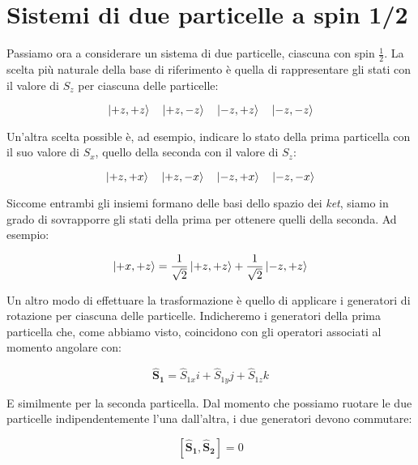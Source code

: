\section{Sistemi di due particelle a spin 1/2}

	Passiamo ora a considerare un sistema di due particelle, ciascuna con spin $\tfrac{1}{2}$. La scelta pi\`u naturale della base di riferimento \`e quella di rappresentare gli stati con il valore di $S_z$ per ciascuna delle particelle:

	\begin{equation} \label{eq:twoPartState}
		\ket{+z, +z} \quad \ket{+z, -z} \quad \ket{-z, +z} \quad \ket{-z, -z}
	\end{equation}	

Un'altra scelta possible \`e, ad esempio, indicare lo stato della prima particella con il suo valore di $S_x$, quello della seconda con il valore di $S_z$:

	\begin{equation}
		\ket{+z, +x} \quad \ket{+z, -x} \quad \ket{-z, +x} \quad \ket{-z, -x}
	\end{equation}

Siccome entrambi gli insiemi formano delle basi dello spazio dei \textit{ket}, siamo in grado di sovrapporre gli stati della prima per ottenere quelli della seconda. Ad esempio:

	\begin{equation}
		\ket{+x, +z} = \frac{1}{\sqrt{2}}\ket{+z, +z} + \frac{1}{\sqrt{2}}\ket{-z, +z}
	\end{equation}	

Un altro modo di effettuare la trasformazione \`e quello di applicare i generatori di rotazione per ciascuna delle particelle. Indicheremo i generatori della prima particella che, come abbiamo visto, coincidono con gli operatori associati al momento angolare con:

	\begin{equation}
		\mathbf{\hat{S}_1} = \hat{S}_{1x} i + \hat{S}_{1y} j + \hat{S}_{1z} k
	\end{equation}

E similmente per la seconda particella. Dal momento che possiamo ruotare le due particelle indipendentemente l'una dall'altra, i due generatori devono commutare:

	\begin{equation}
		\left [ \mathbf{\hat{S}_1}, \mathbf{\hat{S}_2} \right ] = 0
	\end{equation}

